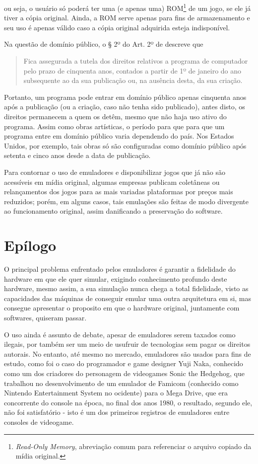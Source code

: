 \documentclass[12pt]{article}
\begin{document}
ou seja, o usuário só poderá ter uma (e apenas uma) ROM\footnote{\emph{Read-Only
Memory}, abreviação comum para referenciar o arquivo copiado da mídia original.}
de um jogo, se ele já tiver a cópia original. Ainda, a ROM serve apenas para
fins de armazenamento e seu uso é apenas válido caso a cópia original adquirida
esteja indisponível.

Na questão de domínio público, o § 2º do Art. 2º de \cite{lei9609} descreve que

\begin{quote}
Fica assegurada a tutela dos direitos relativos a programa de computador pelo
prazo de cinquenta anos, contados a partir de 1º de janeiro do ano subsequente
ao da sua publicação ou, na ausência desta, da sua criação.
\end{quote}

Portanto, um programa pode entrar em domínio público apenas cinquenta anos após
a publicação (ou a criação, caso não tenha sido publicado), antes disto, os
direitos permanecem a quem os detêm, mesmo que não haja uso ativo do programa.
Assim como obras artísticas, o período para que para que um programa entre em
domínio público varia dependendo do país. Nos Estados Unidos, por exemplo, tais
obras só são configuradas como domínio público após setenta e cinco anos desde a
data de publicação.

Para contornar o uso de emuladores e disponibilizar jogos que já não são
acessíveis em mídia original, algumas empresas publicam coletâneas ou
relançamentos dos jogos para as mais variadas plataformas por preços mais
reduzidos; porém, em alguns casos, tais emulações são feitas de modo divergente
ao funcionamento original, assim danificando a preservação do software.

\section{Epílogo}
O principal problema enfrentado pelos emuladores é garantir a fidelidade do
hardware em que ele quer simular, exigindo conhecimento profundo deste hardware,
mesmo assim, a sua simulação nunca chega a total fidelidade, visto as capacidades
das máquinas de conseguir emular uma outra arquitetura em si, mas consegue
apresentar o proposito em que o hardware original, juntamente com softwares,
quiseram passar.

O uso ainda é assunto de debate, apesar de emuladores serem taxados como ilegais,
por também ser um meio de usufruir de tecnologias sem pagar os direitos autorais.
No entanto, até mesmo no mercado, emuladores são usados para fins de estudo, como
foi o caso do programador e game designer Yuji Naka, conhecido como um dos
criadores do personagem de videogames Sonic the Hedgehog, que trabalhou no
desenvolvimento de um emulador de Famicom (conhecido como Nintendo Entertainment
System no ocidente) para o Mega Drive, que era concorrente do console na época, no
final dos anos 1980, o resultado, segundo ele, não foi satisfatório - isto é um dos
primeiros registros de emuladores entre consoles de videogame.
\end{document}
